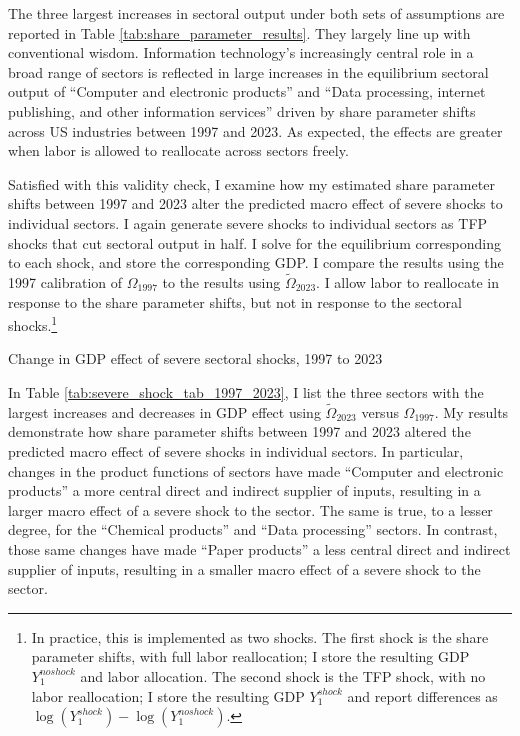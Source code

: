 \documentclass[11pt]{article}
\begin{document}
The three largest increases in sectoral output under both sets of assumptions are reported in Table \ref{tab:share_parameter_results}. They largely line up with conventional wisdom. Information technology's increasingly central role in a broad range of sectors is reflected in large increases in the equilibrium sectoral output of ``Computer and electronic products'' and ``Data processing, internet publishing, and other information services'' driven by share parameter shifts across US industries between 1997 and 2023. As expected, the effects are greater when labor is allowed to reallocate across sectors freely.

Satisfied with this validity check, I examine how my estimated share parameter shifts between 1997 and 2023 alter the predicted macro effect of severe shocks to individual sectors. I again generate severe shocks to individual sectors as TFP shocks that cut sectoral output in half. I solve for the equilibrium corresponding to each shock, and store the corresponding GDP. I compare the results using the 1997 calibration of $\Omega_{1997}$ to the results using $\tilde{\Omega}_{2023}$. I allow labor to reallocate in response to the share parameter shifts, but not in response to the sectoral shocks.\footnote{In practice, this is implemented as two shocks. The first shock is the share parameter shifts, with full labor reallocation; I store the resulting GDP $Y_1^{noshock}$ and labor allocation. The second shock is the TFP shock, with no labor reallocation; I store the resulting GDP $Y_1^{shock}$ and report differences as $\log(Y_1^{shock}) - \log(Y_1^{noshock})$.} 

\begin{table}[!h]
    \centering 
    \caption{Change in GDP effect of severe sectoral shocks, 1997 to 2023}
    \label{tab:severe_shock_tab_1997_2023}
    
\end{table}

In Table \ref{tab:severe_shock_tab_1997_2023}, I list the three sectors with the largest increases and decreases in GDP effect using $\tilde{\Omega}_{2023}$ versus $\Omega_{1997}$. My results demonstrate how share parameter shifts between 1997 and 2023 altered the predicted macro effect of severe shocks in individual sectors. In particular, changes in the product functions of sectors have made ``Computer and electronic products'' a more central direct and indirect supplier of inputs, resulting in a larger macro effect of a severe shock to the sector. The same is true, to a lesser degree, for the ``Chemical products'' and ``Data processing'' sectors. In contrast, those same changes have made ``Paper products'' a less central direct and indirect supplier of inputs, resulting in a smaller macro effect of a severe shock to the sector. 
\end{document}

